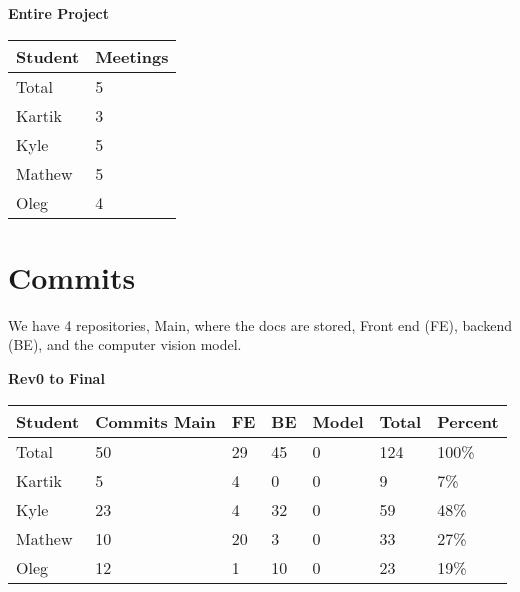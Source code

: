 \documentclass{article}
\begin{document}
\begin{table}[H]
\centering
\textbf{Entire Project}\\
\begin{tabular}{ll}
\toprule
\textbf{Student} & \textbf{Meetings}\\
\midrule
Total & 5\\
Kartik & 3\\
Kyle   & 5\\
Mathew & 5\\
Oleg   & 4\\
\bottomrule
\end{tabular}
\end{table}


\section{Commits}

We have 4 repositories, Main, where the docs are stored, Front end (FE), backend (BE), and the computer vision model.
\begin{table}[H]
    \centering
    \textbf{Rev0 to Final}\\
    \begin{tabular}{lllllll}
    \toprule
    \textbf{Student} & \textbf{Commits Main} & \textbf{FE} & \textbf{BE} & \textbf{Model} & \textbf{Total}& \textbf{Percent}\\
    \midrule
    Total & 50 & 29 & 45 & 0 & 124 & 100\% \\
    Kartik & 5 & 4 & 0 & 0 & 9 & 7\%\\
    Kyle   & 23 & 4 & 32 & 0 & 59 & 48\%\\
    Mathew & 10 & 20 & 3 & 0 & 33 & 27\% \\
    Oleg   & 12 &  1 & 10 & 0 & 23 & 19\% \\
    \bottomrule
    \end{tabular}
\end{table}
\end{document}
